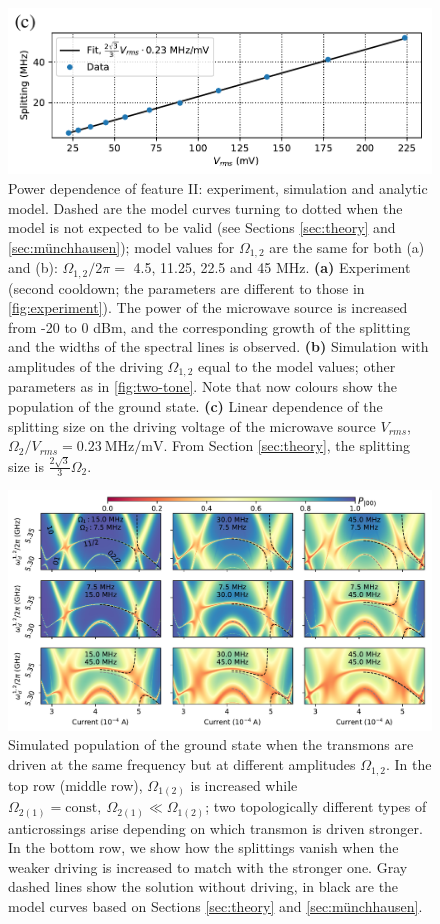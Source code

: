 \documentclass[%
 aps, prx,
 amsmath,amssymb,
 reprint,%
superscriptaddress
]{revtex4-2}
\begin{document}
\begin{figure}
	\includegraphics[width=.7\linewidth]{powerscan_1d}
	\caption{Power dependence of feature II: 
	experiment, simulation and analytic model. Dashed are the model curves turning to dotted when the 
	model is not expected to be valid (see 
	Sections \ref{sec:theory} and 
	\ref{sec:münchhausen}); model values for 
	$\Omega_{1,2}$ are the same for both (a) and 
	(b): $\Omega_{1,2}/2\pi=$ 4.5, 11.25, 22.5 
	and 45 MHz. \textbf{(a)} Experiment (second 
	cooldown; the parameters are different to 
	those in \autoref{fig:experiment}). The power 
	of the microwave source is increased from -20 
	to 0 dBm, and the corresponding growth of the 
	splitting and the widths of the spectral 
	lines is observed. \textbf{(b)} Simulation 
	with amplitudes of the driving $\Omega_{1,2}$ 
	equal to the model values; other parameters 
	as in \autoref{fig:two-tone}. Note that now 
	colours show the population of the ground 
	state. \textbf{(c)} Linear dependence of the 
	splitting size on the driving voltage of the 
	microwave source $V_{rms}$, ${\Omega_2}/{V_{rms}} = 0.23\ 
	{\text{MHz}}/{\text{mV}}$. From Section 
	\ref{sec:theory}, the splitting size is 
	$\frac{2\sqrt{3}}{3} \Omega_2$.}
	\label{fig:zoom}
\end{figure}


\begin{figure}
	\centering
	\includegraphics[width=\linewidth]{topological_splittings}
	\caption{Simulated population of the ground 
	state when the transmons are driven at the 
	same frequency but at different amplitudes 
	$\Omega_{1,2}$. In the top row (middle row), 
	$\Omega_{1(2)}$ is increased while 
	$\Omega_{2(1)} = \text{const},\ \Omega_{2(1)} \ll 
	\Omega_{1(2)}$; two topologically different 
	types of anticrossings arise depending on 
	which transmon is driven stronger. In the 
	bottom row, we show how the splittings vanish 
	when the weaker driving is increased to match 
	with the stronger one. Gray dashed lines show 
	the solution without driving, in black are 
	the model curves based on Sections 
	\ref{sec:theory} and \ref{sec:münchhausen}.}
	\label{fig:difdrive}
\end{figure}
\end{document}
